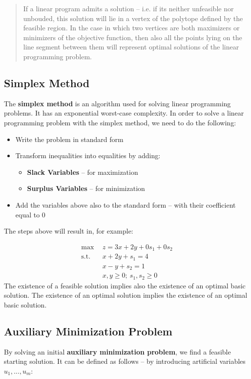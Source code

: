 \documentclass{article}
\begin{document}
\blockquote{
If a linear program admits a solution -- i.e. if its neither unfeasible nor unbouded, this solution will lie in a vertex of the polytope defined by the feasible region. In the case in which two vertices are both maximizers or minimizers of the objective function, then also all the points lying on the line segment between them will represent optimal solutions of the linear programming problem.}

\subsection{Simplex Method}
The \textbf{simplex method} is an algorithm used for solving linear programming problems. It has an exponential worst-case complexity. In order to solve a linear programming problem with the simplex method, we need to do the following:

\begin{itemize}
	\item Write the problem in standard form
	\item Transform inequalities into equalities by adding:
	\begin{itemize}
		\item \textbf{Slack Variables} -- for maximization
		\item \textbf{Surplus Variables} -- for minimization
	\end{itemize}
	\item Add the variables above also to the standard form -- with their coefficient equal to 0
\end{itemize}
The steps above will result in, for example:

\begin{align*}
	\max~~ & z = 3x+2y+0s_1+0s_2 \\
	\text{s.t.}~~ & x+2y+s_1 = 4 \\
	~~& x-y+s_2 = 1 \\
	~~& x,y \geq 0;~ s_1, s_2 \geq 0
\end{align*}
The existence of a feasible solution implies also the existence of an optimal basic solution. The existence of an optimal solution implies the existence of an optimal basic solution.

\subsection{Auxiliary Minimization Problem}
By solving an initial \textbf{auxiliary minimization problem}, we find a feasible starting solution. It can be defined as follows -- by introducing artificial variables $u_1, ..., u_m$:
\end{document}
